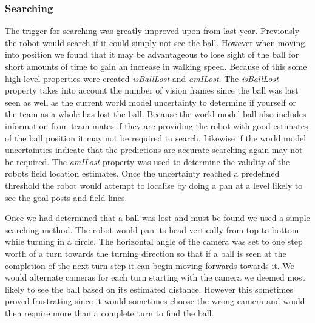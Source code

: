 \subsubsection{Searching}
The trigger for searching was greatly improved upon from last year. Previously the robot would search if it could simply not see the ball. However when moving into position we found that it may be advantageous to lose sight of the ball for short amounts of time to gain an increase in walking speed. Because of this some high level properties were created \emph{isBallLost} and \emph{amILost}. The \emph{isBallLost} property takes into account the number of vision frames since the ball was last seen as well as the current world model uncertainty to determine if yourself or the team as a whole has lost the ball. Because the world model ball also includes information from team mates if they are providing the robot with good estimates of the ball position it may not be required to search. Likewise if the world model uncertainties indicate that the predictions are accurate searching again may not be required. The \emph{amILost} property was used to determine the validity of the robots field location estimates. Once the uncertainty reached a predefined threshold the robot would attempt to localise by doing a pan at a level likely to see the goal posts and field lines.

Once we had determined that a ball was lost and must be found we used a simple searching method. The robot would pan its head vertically from top to bottom while turning in a circle. The horizontal angle of the camera was set to one step worth of a turn towards the turning direction so that if a ball is seen at the completion of the next turn step it can begin moving forwards towards it. We would alternate cameras for each turn starting with the camera we deemed most likely to see the ball based on its estimated distance. However this sometimes proved frustrating since it would sometimes choose the wrong camera and would then require more than a complete turn to find the ball.


